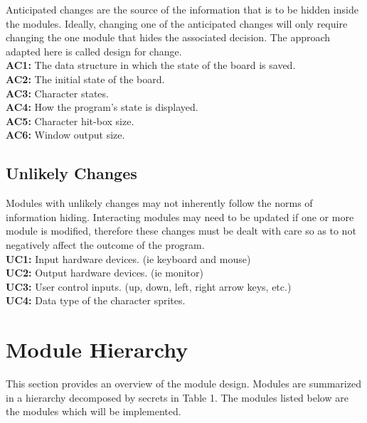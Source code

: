 \documentclass[12pt, letterpaper]{article}
\begin{document}
	Anticipated changes are the source of the information that is to be hidden inside the modules. Ideally, changing one of the anticipated changes will only require changing the one module that hides the associated decision. The approach adapted here is called design for change.\\
	
	\textbf{AC1:} The data structure in which the state of the board is saved.\\
	
	\textbf{AC2:} The initial state of the board.\\
	
	\textbf{AC3:} Character states.\\
	
	\textbf{AC4:} How the program's state is displayed.\\
	
	\textbf{AC5:} Character hit-box size.\\
	
	\textbf{AC6:} Window output size.
	
	\subsection{Unlikely Changes}
	
	Modules with unlikely changes may not inherently follow the norms of information hiding. Interacting modules may need to be updated if one or more module is modified, therefore these changes must be dealt with care so as to not negatively affect the outcome of the program.\\
	
	\textbf{UC1:} Input hardware devices. (ie keyboard and mouse)\\
	
	\textbf{UC2:} Output hardware devices. (ie monitor)\\
	
	\textbf{UC3:} User control inputs. (up, down, left, right arrow keys, etc.)\\
	
	\textbf{UC4:} Data type of the character sprites.
	
	\section{Module Hierarchy}
	This section provides an overview of the module design. Modules are summarized in a hierarchy decomposed by secrets in Table 1. The modules listed below are the modules which will be implemented.\\
	
\end{document}
